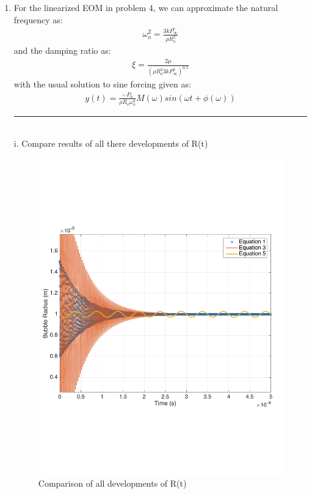 \documentclass[12pt]{article}
\begin{document}
\begin{enumerate}
\newpage 
\item For the linearized EOM in problem 4, we can approximate the natural frequency as:
\begin{align*}
\omega_o^2 = \frac{3kP_\infty^e}{\rho R_o^2}
\end{align*}
and the damping ratio as:
\begin{align*}
\xi = \frac{2\mu}{(\rho R_o^2 3kP_\infty^2)^{0.5}}
\end{align*}
with the usual solution to sine forcing given as:
\begin{align*}
y(t) = \frac{-P_a}{\rho R_o \omega_o^2} M(\omega) sin(\omega t + \phi(\omega))
\end{align*}
\noindent\rule{14cm}{0.4pt}\\
i. Compare results of all there developments of R(t)
\begin{figure}[h]
\includegraphics[scale = 0.5]{Compare_All}
\centering
\caption{Comparison of all developments of R(t)}
\end{figure}
\end{enumerate}
\end{document}
